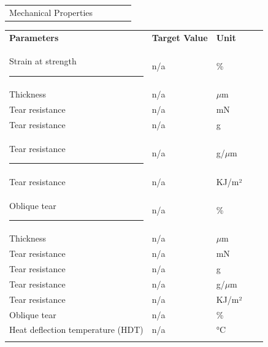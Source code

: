 \documentclass{article}
\begin{document}
\begin{center}
\begin{tabularx}
{\textwidth}{X l  l  l  l }\rowcolor{color_title}Mechanical Properties &  &  &  &  \\

\end{tabularx}\begin{paracol}{2}
\begin{tabularx}{0.5\textwidth}
{X l  l  l  l }\textbf{Parameters} & \textbf{Target Value} & \textbf{Unit} &  &  \\
Strain at strength \rule{80pt}{0pt} & n/a & \% &  &  \\
\arrayrulecolor{line_color}\hline
Thickness & n/a & \(\mu\)m &  &  \\
\arrayrulecolor{line_color}\hline
Tear resistance & n/a & mN &  &  \\
\arrayrulecolor{line_color}\hline
Tear resistance & n/a & g &  &  \\
\arrayrulecolor{line_color}\hline
Tear resistance \rule{80pt}{0pt} & n/a & g/\(\mu\)m &  &  \\
\arrayrulecolor{line_color}\hline
Tear resistance & n/a & KJ/m² &  &  \\
\arrayrulecolor{line_color}\hline
Oblique tear \rule{80pt}{0pt} & n/a & \% &  &  \\
\arrayrulecolor{line_color}\hline
Thickness & n/a & \(\mu\)m &  &  \\
\arrayrulecolor{line_color}\hline
Tear resistance & n/a & mN &  &  \\
\arrayrulecolor{line_color}\hline
Tear resistance & n/a & g &  &  \\
\arrayrulecolor{line_color}\hline
Tear resistance & n/a & g/\(\mu\)m &  &  \\
\arrayrulecolor{line_color}\hline
Tear resistance & n/a & KJ/m² &  &  \\
\arrayrulecolor{line_color}\hline
Oblique tear & n/a & \% &  &  \\
\arrayrulecolor{line_color}\hline
Heat deflection temperature (HDT) & n/a & °C &  &  \\
\arrayrulecolor{line_color}\hline


\end{tabularx}
\end{paracol}
\end{center}
\end{document}

